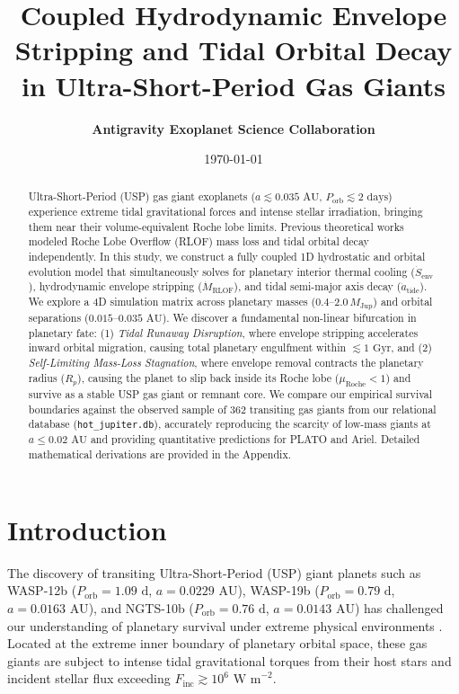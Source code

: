 \documentclass[twocolumn,10pt]{article}
\title{\textbf{Coupled Hydrodynamic Envelope Stripping and Tidal Orbital Decay in Ultra-Short-Period Gas Giants}}
\author{\textbf{Antigravity Exoplanet Science Collaboration}}
\date{\today}
\providecommand{\citep}[1]{\cite{#1}}
\begin{document}
\maketitle

\begin{abstract}
Ultra-Short-Period (USP) gas giant exoplanets ($a \lesssim 0.035\text{ AU}$, $P_{\text{orb}} \lesssim 2\text{ days}$) experience extreme tidal gravitational forces and intense stellar irradiation, bringing them near their volume-equivalent Roche lobe limits. Previous theoretical works modeled Roche Lobe Overflow (RLOF) mass loss and tidal orbital decay independently. In this study, we construct a fully coupled 1D hydrostatic and orbital evolution model that simultaneously solves for planetary interior thermal cooling ($\dot{S}_{\text{env}}$), hydrodynamic envelope stripping ($\dot{M}_{\text{RLOF}}$), and tidal semi-major axis decay ($\dot{a}_{\text{tide}}$). We explore a 4D simulation matrix across planetary masses ($0.4\text{--}2.0\,M_{\text{Jup}}$) and orbital separations ($0.015\text{--}0.035\text{ AU}$). We discover a fundamental non-linear bifurcation in planetary fate: (1) \textit{Tidal Runaway Disruption}, where envelope stripping accelerates inward orbital migration, causing total planetary engulfment within $\lesssim 1\text{ Gyr}$, and (2) \textit{Self-Limiting Mass-Loss Stagnation}, where envelope removal contracts the planetary radius ($R_p$), causing the planet to slip back inside its Roche lobe ($\mu_{\text{Roche}} < 1$) and survive as a stable USP gas giant or remnant core. We compare our empirical survival boundaries against the observed sample of 362 transiting gas giants from our relational database (\texttt{hot\_jupiter.db}), accurately reproducing the scarcity of low-mass giants at $a \le 0.02\text{ AU}$ and providing quantitative predictions for PLATO and Ariel. Detailed mathematical derivations are provided in the Appendix.
\end{abstract}

\section{Introduction}
The discovery of transiting Ultra-Short-Period (USP) giant planets such as WASP-12b ($P_{\text{orb}} = 1.09\text{ d}$, $a = 0.0229\text{ AU}$), WASP-19b ($P_{\text{orb}} = 0.79\text{ d}$, $a = 0.0163\text{ AU}$), and NGTS-10b ($P_{\text{orb}} = 0.76\text{ d}$, $a = 0.0143\text{ AU}$) has challenged our understanding of planetary survival under extreme physical environments \citep{Charbonneau2000, Dawson2018}. Located at the extreme inner boundary of planetary orbital space, these gas giants are subject to intense tidal gravitational torques from their host stars and incident stellar flux exceeding $F_{\text{inc}} \gtrsim 10^6\text{ W m}^{-2}$.
\end{document}

